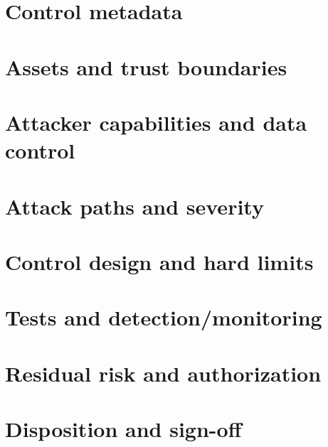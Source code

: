 \documentclass[11pt,letterpaper]{article}
\begin{document}
\makedoctitle\makedocsummary
\section{Control metadata}
\section{Assets and trust boundaries}
\section{Attacker capabilities and data control}
\section{Attack paths and severity}
\section{Control design and hard limits}
\section{Tests and detection/monitoring}
\section{Residual risk and authorization}
\section{Disposition and sign-off}
\end{document}
